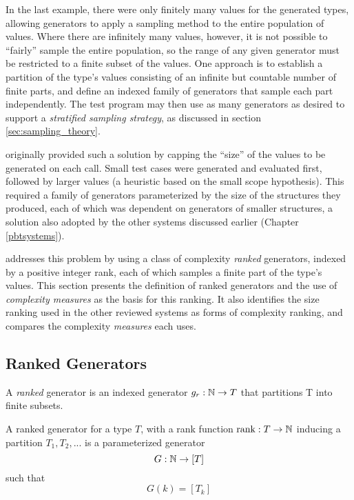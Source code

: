 
In the last example,
there were only finitely many values for the generated types,
allowing generators to apply a sampling method to the entire population of values.
Where there are infinitely many values, however,
it is not possible to ``fairly'' sample the entire population,
so the range of any given generator must be restricted to a finite subset of the values.
One approach is to establish a partition of the type's values
consisting of an infinite but countable number of finite parts,
and define an indexed family of generators that sample each part independently.
The test program may then use as many generators as desired
to support a \emph{stratified sampling strategy},
as discussed in section \ref{sec:sampling_theory}.

\QC originally provided such a solution by
capping the ``size'' of the values to be generated on each call.
Small test cases were generated and evaluated first,
followed by larger values (a heuristic based on the small scope hypothesis).
This required a family of generators parameterized by the size of the structures they produced,
each of which was dependent on generators of smaller structures,
a solution also adopted by the other \pbt systems discussed earlier
(Chapter \ref{pbtsystems}).

\GC addresses this problem by using a class of complexity \emph{ranked} generators,
indexed by a positive integer rank,
each of which samples a finite part of the type's values.
This section presents the definition of \GC ranked generators and
the use of \emph{complexity measures} as the basis for this ranking.
It also identifies the size ranking used in the other reviewed \pbt systems
as forms of complexity ranking,
and compares the complexity \emph{measures} each uses.

\subsection{Ranked Generators}
A \emph{ranked} generator is an indexed generator $g_r : \mathbb{N} \rightarrow T$
that partitions T into finite subsets.

\begin{df}\label{def:rankedgen}
A ranked generator for a type $T$,
with a rank function $\text{rank} : T \rightarrow \mathbb{N}$  inducing a partition $T_1, T_2, ...$
is a parameterized generator
$$G : \mathbb{N} \rightarrow [ T ] $$
such that
$$G(k) = [T_k]$$

\end{df}

